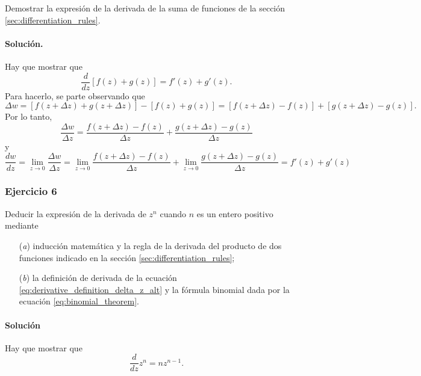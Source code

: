 \documentclass[a4paper]{report}
\begin{document}
Demostrar la expresión de la derivada de la suma de funciones de la sección \ref{sec:differentiation_rules}.

\paragraph{Solución.} Hay que mostrar que 
\[
 \frac{d}{dz}[f(z)+g(z)]=f'(z)+g'(z).
\]
Para hacerlo, se parte observando que 
\[
 \Delta w=[f(z+\Delta z)+g(z+\Delta z)]-[f(z)+g(z)]=[f(z+\Delta z)-f(z)]+[g(z+\Delta z)-g(z)].
\]
Por lo tanto,
\[
 \frac{\Delta w}{\Delta z}=\frac{f(z+\Delta z)-f(z)}{\Delta z}+\frac{g(z+\Delta z)-g(z)}{\Delta z}
\]
y
\[
 \frac{dw}{dz}=\lim_{z\to0}\frac{\Delta w}{\Delta z}=\lim_{z\to0}\frac{f(z+\Delta z)-f(z)}{\Delta z}+\lim_{z\to0}\frac{g(z+\Delta z)-g(z)}{\Delta z}=f'(z)+g'(z)
\]

\subsubsection{Ejercicio 6}

Deducir la expresión de la derivada de \(z^n\) cuando \(n\) es un entero positivo mediante
\begin{enumerate}
 \item[(\textit{a})] inducción matemática y la regla de la derivada del producto de dos funciones indicado en la sección \ref{sec:differentiation_rules};
 \item[(\textit{b})] la definición de derivada de la ecuación \ref{eq:derivative_definition_delta_z_alt} y la fórmula binomial dada por la ecuación \ref{eq:binomial_theorem}.
\end{enumerate}

\paragraph{Solución}

Hay que mostrar que 
\[
 \frac{d}{dz}z^n=nz^{n-1}.
\]
\end{document}
